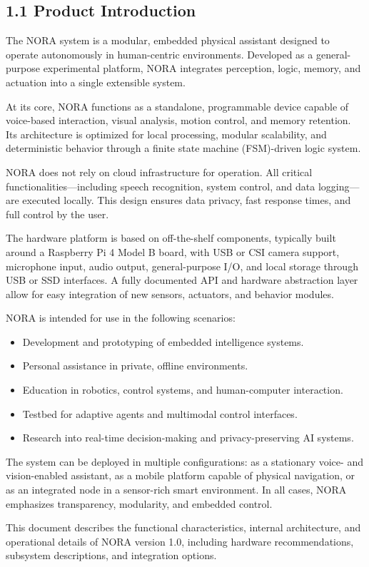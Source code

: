 \subsection*{1.1 Product Introduction}

The NORA system is a modular, embedded physical assistant designed to operate autonomously in human-centric environments. Developed as a general-purpose experimental platform, NORA integrates perception, logic, memory, and actuation into a single extensible system.

At its core, NORA functions as a standalone, programmable device capable of voice-based interaction, visual analysis, motion control, and memory retention. Its architecture is optimized for local processing, modular scalability, and deterministic behavior through a finite state machine (FSM)-driven logic system.

NORA does not rely on cloud infrastructure for operation. All critical functionalities—including speech recognition, system control, and data logging—are executed locally. This design ensures data privacy, fast response times, and full control by the user.

The hardware platform is based on off-the-shelf components, typically built around a Raspberry Pi 4 Model B board, with USB or CSI camera support, microphone input, audio output, general-purpose I/O, and local storage through USB or SSD interfaces. A fully documented API and hardware abstraction layer allow for easy integration of new sensors, actuators, and behavior modules.

NORA is intended for use in the following scenarios:
\begin{itemize}
    \item Development and prototyping of embedded intelligence systems.
    \item Personal assistance in private, offline environments.
    \item Education in robotics, control systems, and human-computer interaction.
    \item Testbed for adaptive agents and multimodal control interfaces.
    \item Research into real-time decision-making and privacy-preserving AI systems.
\end{itemize}

The system can be deployed in multiple configurations: as a stationary voice- and vision-enabled assistant, as a mobile platform capable of physical navigation, or as an integrated node in a sensor-rich smart environment. In all cases, NORA emphasizes transparency, modularity, and embedded control.

This document describes the functional characteristics, internal architecture, and operational details of NORA version 1.0, including hardware recommendations, subsystem descriptions, and integration options.
